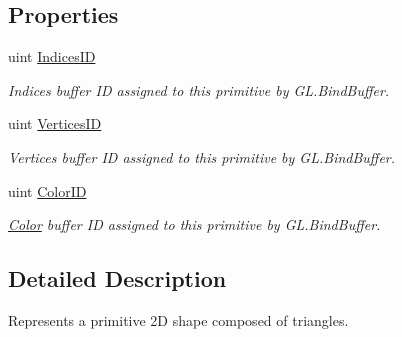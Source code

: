 \subsection*{Properties}
\begin{DoxyCompactItemize}
\item 
uint \hyperlink{class_tri_devs_1_1_tri_engine_1_1_graphics_1_1_primitive_a2cc647531c7713b290d09b0131c48411}{Indices\-I\-D}
\begin{DoxyCompactList}\small\item\em Indices buffer I\-D assigned to this primitive by G\-L.\-Bind\-Buffer. \end{DoxyCompactList}\item 
uint \hyperlink{class_tri_devs_1_1_tri_engine_1_1_graphics_1_1_primitive_ab69b6bf1de5e766b83c4dbc19604cd3e}{Vertices\-I\-D}
\begin{DoxyCompactList}\small\item\em Vertices buffer I\-D assigned to this primitive by G\-L.\-Bind\-Buffer. \end{DoxyCompactList}\item 
uint \hyperlink{class_tri_devs_1_1_tri_engine_1_1_graphics_1_1_primitive_a0bd74b43131748d2876b7f389858c7cf}{Color\-I\-D}
\begin{DoxyCompactList}\small\item\em \hyperlink{struct_tri_devs_1_1_tri_engine_1_1_color}{Color} buffer I\-D assigned to this primitive by G\-L.\-Bind\-Buffer. \end{DoxyCompactList}\end{DoxyCompactItemize}


\subsection{Detailed Description}
Represents a primitive 2\-D shape composed of triangles. 



